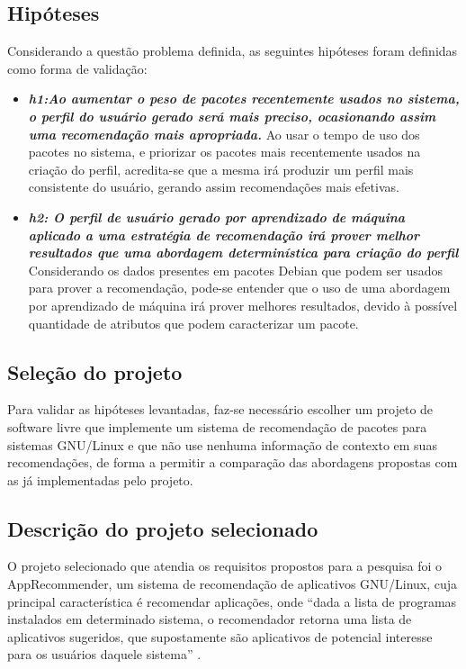 \subsection{Hipóteses} \label{sec:hipoteses}

Considerando a questão problema definida, as seguintes hipóteses foram definidas
como forma de validação:

\begin{itemize} \item \textit{\textbf{h1:Ao aumentar o peso de pacotes
recentemente usados no sistema, o perfil do usuário gerado será mais preciso,
ocasionando assim uma recomendação mais apropriada.}} Ao usar o tempo de uso dos
pacotes no sistema, e priorizar os pacotes mais recentemente usados na criação
do perfil, acredita-se que a mesma irá produzir um perfil mais
consistente do usuário, gerando assim recomendações mais efetivas.\item
\textit{\textbf{h2: O perfil de usuário gerado por aprendizado de máquina aplicado a uma
estratégia de recomendação irá prover melhor resultados que uma abordagem
determinística para criação do perfil}}
Considerando os dados presentes em pacotes Debian que podem ser
usados para prover a recomendação, pode-se entender que o uso de uma abordagem
por aprendizado de máquina irá prover melhores resultados, devido à possível
quantidade de atributos que podem caracterizar um pacote.
\end{itemize}

\subsection{Seleção do projeto}

Para validar as hipóteses levantadas, faz-se necessário escolher um projeto de
software livre que implemente um sistema de recomendação de pacotes
para sistemas GNU/Linux e que não use nenhuma informação de contexto em suas
recomendações, de forma a permitir a comparação das abordagens propostas com as
já implementadas pelo projeto.

\subsection{Descrição do projeto selecionado}

O projeto selecionado que atendia os requisitos propostos para a pesquisa foi o AppRecommender,
um sistema de recomendação de aplicativos GNU/Linux, cuja principal característica é recomendar aplicações,
onde “dada a lista de programas instalados em determinado sistema, o recomendador retorna uma lista de aplicativos
sugeridos, que supostamente são aplicativos de potencial interesse para os usuários daquele sistema”
\cite{araujo2011apprecommender}.

